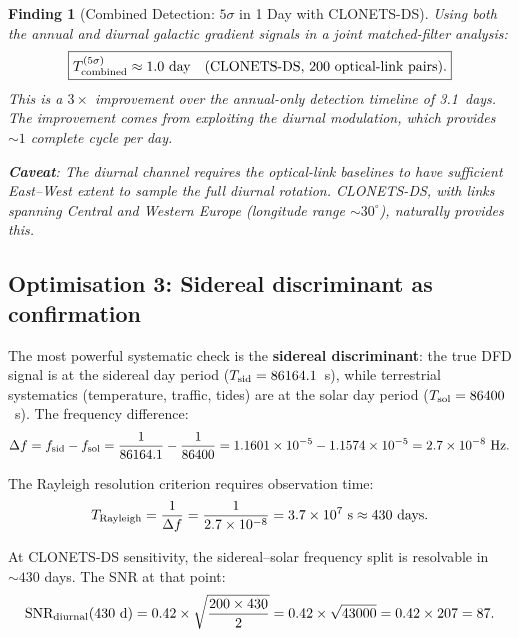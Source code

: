 \documentclass[11pt]{article}
\newtheorem{finding}{Finding}
\newcommand{\ee}[1]{\times 10^{#1}}
\begin{document}
\begin{finding}[Combined Detection: $5\sigma$ in 1 Day with CLONETS-DS]
\label{find:combined-1day}
Using both the annual and diurnal galactic gradient signals in a joint
matched-filter analysis:
\begin{equation}
\boxed{T^{(5\sigma)}_{\rm combined} \approx 1.0~\text{day}
\quad\text{(CLONETS-DS, 200 optical-link pairs).}}
\end{equation}
This is a $3\times$ improvement over the annual-only detection timeline
of 3.1~days. The improvement comes from exploiting the diurnal modulation,
which provides $\sim 1$ complete cycle per day.

\textbf{Caveat}: The diurnal channel requires the optical-link baselines
to have sufficient East--West extent to sample the full diurnal rotation.
CLONETS-DS, with links spanning Central and Western Europe
(longitude range $\sim 30^\circ$), naturally provides this.
\end{finding}

\subsection{Optimisation 3: Sidereal discriminant as confirmation}

The most powerful systematic check is the \textbf{sidereal discriminant}:
the true DFD signal is at the sidereal day period ($T_{\rm sid} = 86164.1$~s),
while terrestrial systematics (temperature, traffic, tides) are at the
solar day period ($T_{\rm sol} = 86400$~s). The frequency difference:
\begin{equation}
\Delta f = f_{\rm sid} - f_{\rm sol}
= \frac{1}{86164.1} - \frac{1}{86400}
= 1.1601\ee{-5} - 1.1574\ee{-5}
= 2.7\ee{-8}~\text{Hz}.
\end{equation}

The Rayleigh resolution criterion requires observation time:
\begin{equation}
T_{\rm Rayleigh} = \frac{1}{\Delta f} = \frac{1}{2.7\ee{-8}}
= 3.7\ee{7}~\text{s} \approx 430~\text{days}.
\end{equation}

At CLONETS-DS sensitivity, the sidereal--solar frequency split is
resolvable in $\sim 430$ days. The SNR at that point:
\begin{equation}
\text{SNR}_{\rm diurnal}(430~\text{d}) = 0.42\times\sqrt{\frac{200\times430}{2}}
= 0.42\times\sqrt{43000} = 0.42\times 207 = 87.
\end{equation}
\end{document}
